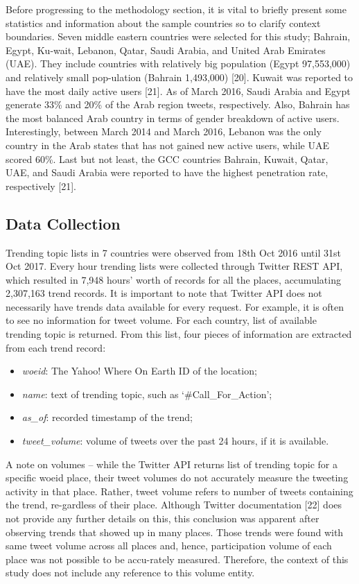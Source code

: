 \documentclass{llncs}
\begin{document}
Before progressing to the methodology section, it is vital to briefly
present some statistics and information about the sample countries so
to clarify context boundaries.  Seven middle eastern countries were
selected for this study; Bahrain, Egypt, Ku-wait, Lebanon, Qatar,
Saudi Arabia, and United Arab Emirates (UAE). They include countries
with relatively big population (Egypt 97,553,000) and relatively small
pop-ulation (Bahrain 1,493,000) [20]. Kuwait was reported to have the
most daily active users [21]. As of March 2016, Saudi Arabia and Egypt
generate 33\% and 20\% of the Arab region tweets, respectively. Also,
Bahrain has the most balanced Arab country in terms of gender
breakdown of active users. Interestingly, between March 2014 and March
2016, Lebanon was the only country in the Arab states that has not
gained new active users, while UAE scored 60\%. Last but not least,
the GCC countries Bahrain, Kuwait, Qatar, UAE, and Saudi Arabia were
reported to have the highest penetration rate, respectively [21].

\subsection{Data Collection}

Trending topic lists in 7 countries were observed from 18th Oct 2016
until 31st Oct 2017. Every hour trending lists were collected through
Twitter REST API, which resulted in 7,948 hours' worth of records for
all the places, accumulating 2,307,163 trend records. It is important
to note that Twitter API does not necessarily have trends data
available for every request. For example, it is often to see no
information for tweet volume. For each country, list of available
trending topic is returned. From this list, four pieces of information
are extracted from each trend record:

\begin{itemize}
\item {\emph{woeid}}: The Yahoo! Where On Earth ID of the location;
\item {\emph{name}}: text of trending topic, such as `\#Call\_For\_Action';
\item {\emph{as\_of}}: recorded timestamp of the trend;
\item {\emph{tweet\_volume}}: volume of tweets over the past 24 hours, if it is available.
\end{itemize}

A note on volumes -- while the Twitter API returns list of trending
topic for a specific woeid place, their tweet volumes do not
accurately measure the tweeting activity in that place. Rather, tweet
volume refers to number of tweets containing the trend, re-gardless of
their place. Although Twitter documentation [22] does not provide any
further details on this, this conclusion was apparent after observing
trends that showed up in many places. Those trends were found with
same tweet volume across all places and, hence, participation volume
of each place was not possible to be accu-rately measured. Therefore,
the context of this study does not include any reference to this
volume entity.
\end{document}
